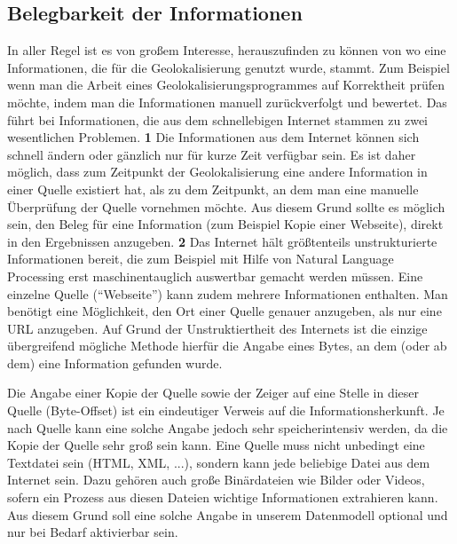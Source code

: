 \subsection{Belegbarkeit der Informationen}
In aller Regel ist es von großem Interesse, herauszufinden zu können von wo eine Informationen, die für die Geolokalisierung genutzt wurde, stammt. Zum Beispiel wenn man die Arbeit eines Geolokalisierungsprogrammes auf Korrektheit prüfen möchte, indem man die Informationen manuell zurückverfolgt und bewertet. Das führt bei Informationen, die aus dem schnellebigen Internet stammen zu zwei wesentlichen Problemen. \textbf{1} Die Informationen aus dem Internet können sich schnell ändern oder gänzlich nur für kurze Zeit verfügbar sein. Es ist daher möglich, dass zum Zeitpunkt der Geolokalisierung eine andere Information in einer Quelle existiert hat, als zu dem Zeitpunkt, an dem man eine manuelle Überprüfung der Quelle vornehmen möchte. Aus diesem Grund sollte es möglich sein, den Beleg für eine Information (zum Beispiel Kopie einer Webseite), direkt in den Ergebnissen  anzugeben. \textbf{2} Das Internet hält größtenteils unstrukturierte Informationen bereit, die zum Beispiel mit Hilfe von Natural Language Processing erst maschinentauglich auswertbar gemacht werden müssen. Eine einzelne Quelle (``Webseite'') kann zudem mehrere Informationen enthalten. Man benötigt eine Möglichkeit, den Ort einer Quelle genauer anzugeben, als nur eine URL anzugeben. Auf Grund der Unstruktiertheit des Internets ist die einzige übergreifend mögliche Methode hierfür die Angabe eines Bytes, an dem (oder ab dem) eine Information gefunden wurde.

Die Angabe einer Kopie der Quelle sowie der Zeiger auf eine Stelle in dieser Quelle (Byte-Offset) ist ein eindeutiger Verweis auf die Informationsherkunft. Je nach Quelle kann eine solche Angabe jedoch sehr speicherintensiv werden, da die Kopie der Quelle sehr groß sein kann. Eine Quelle muss nicht unbedingt eine Textdatei sein (HTML, XML, ...), sondern kann jede beliebige Datei aus dem Internet sein. Dazu gehören auch große Binärdateien wie Bilder oder Videos, sofern ein Prozess aus diesen Dateien wichtige Informationen extrahieren kann. Aus diesem Grund soll eine solche Angabe in unserem Datenmodell optional und nur bei Bedarf aktivierbar sein.

